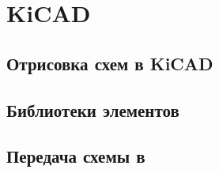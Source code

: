 \chapter{KiCAD} 

\section{Отрисовка схем в KiCAD}

\section{Библиотеки элементов}

\section{Передача схемы в \spice}

